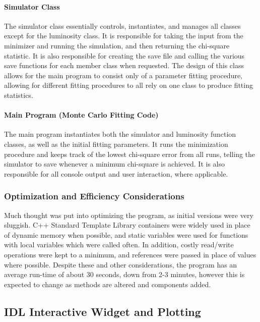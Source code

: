 \documentclass[twocolumn,letterpaper,10pt]{article}
\begin{document}
\paragraph{Simulator Class}
The simulator class essentially controls, instantiates, and manages all classes except for the luminosity class. It is responsible for taking the input from the minimizer and running the simulation, and then returning the chi-square statistic. It is also responsible for creating the save file and calling the various save functions for each member class when requested. The design of this class allows for the main program to consist only of a parameter fitting procedure, allowing for different fitting procedures to all rely on one class to produce fitting statistics.

\paragraph{Main Program (Monte Carlo Fitting Code)}

The main program instantiates both the simulator and luminosity function classes, as well as the initial fitting parameters. It runs the minimization procedure and keeps track of the lowest chi-square error from all runs, telling the simulator to save whenever a minimum chi-square is achieved. It is also responsible for all console output and user interaction, where applicable.

\subsubsection{Optimization and Efficiency Considerations}

Much thought was put into optimizing the program, as initial versions were very sluggish. C++ Standard Template Library containers were widely used in place of dynamic memory when possible, and static variables were used for functions with local variables which were called often. In addition, costly read/write operations were kept to a minimum, and references were passed in place of values where possible. Despite these and other considerations, the program has an average run-time of about 30 seconds, down from 2-3 minutes, however this is expected to change as methods are altered and components added.

\subsection{IDL Interactive Widget and Plotting}
\end{document}
